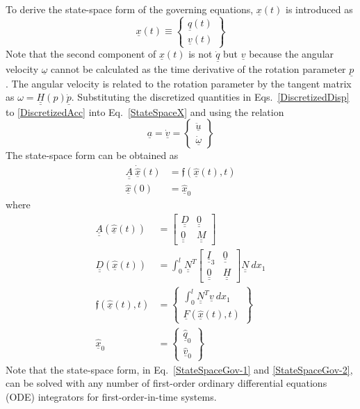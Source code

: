 \documentclass{aiaa-tc}
\newcommand{\tens}[1]{\underline{\underline{#1}}}
\renewcommand{\vec}[1]{\underline{#1}}
\begin{document}
To derive the state-space form of the governing equations,  $\vec{x}(t)$ is introduced as
\begin{equation}
    \label{StateSpaceX}
    \vec{x}(t) \equiv \begin{Bmatrix}
    \vec{q}(t) \\
    \vec{v}(t)
    \end{Bmatrix} 
\end{equation}
Note that the second component of $\vec{x}(t)$ is not $\vec{\dot{q}}$ but $\vec{v}$ because the angular velocity $\vec{\omega}$ cannot be calculated as the time derivative of the rotation parameter $\vec{p}$. The angular velocity is related to the rotation parameter by the tangent matrix as $\omega = \tens{H}(p) \dot{\vec{p}}$. Substituting the discretized quantities in Eqs.~\eqref{DiscretizedDisp} to \eqref{DiscretizedAcc} into Eq.~\eqref{StateSpaceX} and using the relation
\begin{equation}
    \label{AccVel}
    \vec{a} = \vec{\dot{v}} = \begin{Bmatrix}
    \vec{\ddot{u}} \\
    \vec{\dot{\omega}}
    \end{Bmatrix}
\end{equation}
The state-space form can be obtained as
\begin{align}
    \label{StateSpaceGov-1}
    \tens{A} ~\dot{\hat{\vec{x}}}(t) &= \mathfrak{f}(\hat{\vec{x}}(t),t) \\
    \label{StateSpaceGov-2}
    \hat{\vec{x}}(0) &= \hat{\vec{x}}_0
\end{align}
where
\begin{align}
    \label{StateSpaceGov-3}
    \tens{A} (\hat{\vec{x}}(t)) &= \begin{bmatrix}
    \tens{D} & \tens{0} \\
    \tens{0} & \tens{M}
    \end{bmatrix}  \\
    \label{StateSpaceGov-4}
    \tens{D} (\hat{\vec{x}}(t)) &= \int_0^l \tens{N}^T \begin{bmatrix}
    \tens{I}_3 & \tens{0} \\
    \tens{0} & \tens{H}
    \end{bmatrix} 
    \tens{N}~dx_1 \\
    \label{StateSpaceGov-5}
    \mathfrak{f}(\hat{\vec{x}}(t),t) &=  \begin{Bmatrix}
    \int_0^l \tens{N}^T \vec{v}~dx_1 \\
    \vec{F}(\hat{\vec{x}}(t),t)
    \end{Bmatrix} \\
    \label{StateSpaceGov-7}
    \hat{\vec{x}}_0 &= \begin{Bmatrix}
    \hat{\vec{q}}_0 \\
    \hat{\vec{v}}_0
    \end{Bmatrix}
\end{align}
Note that the state-space form, in
Eq.~\eqref{StateSpaceGov-1} and \eqref{StateSpaceGov-2}, can be solved with
any number of first-order ordinary differential equations (ODE) integrators
for first-order-in-time systems. 
\end{document}
